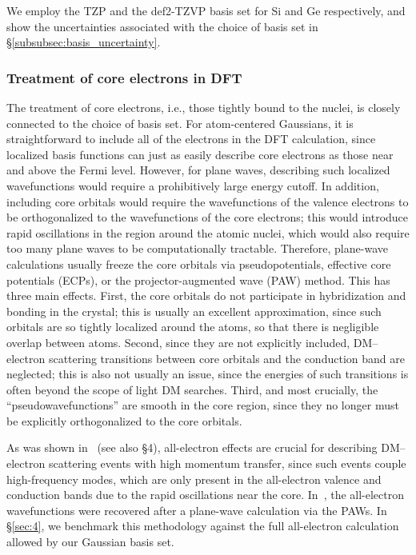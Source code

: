\documentclass[
    prd, twocolumn, superscriptaddress, nofootinbib, amsmath, amssymb,
    aps, floatfix,preprintnumbers
]{revtex4-2}
\begin{document}
        We employ the TZP and the def2-TZVP basis set for Si and Ge respectively, and show the uncertainties associated with the choice of basis set in \S\ref{subsubsec:basis_uncertainty}.
        
        \subsubsection{Treatment of core electrons in DFT}\label{subsubsec:2.1.2}
        The treatment of core electrons, i.e., those tightly bound to the nuclei, is closely connected to the choice of basis set. For atom-centered Gaussians, it is straightforward to include all of the electrons in the DFT calculation, since localized basis functions can just as easily describe core electrons as those near and above the Fermi level. 
        However, for plane waves, describing such localized wavefunctions would require a prohibitively large energy cutoff. In addition, including core orbitals would require the wavefunctions of the valence electrons to be orthogonalized to the wavefunctions of the core electrons; this  would introduce rapid oscillations in the region around the atomic nuclei, which would also require too many plane waves to be computationally tractable. Therefore, plane-wave calculations usually freeze the core orbitals via pseudopotentials, effective core potentials (ECPs), or the projector-augmented wave (PAW) method. This has three main effects. First, the core orbitals do not participate in hybridization and bonding in the crystal; this is usually an excellent approximation, since such orbitals are so tightly localized around the atoms, so that there is negligible overlap between atoms. Second, since they are not explicitly included, DM--electron scattering transitions between core orbitals and the conduction band are neglected; this is also not usually an issue, since the energies of such transitions is often beyond the scope of light DM searches. Third, and most crucially, the ``pseudowavefunctions'' are smooth in the core region, since they no longer must be explicitly orthogonalized to the core orbitals. 
        
        As was shown in~\cite{Liang:2018bdb,Griffin21} (see also \S 4), all-electron effects are crucial for describing DM--electron scattering events with high momentum transfer, since such events couple high-frequency modes, which are only present in the all-electron valence and conduction bands due to the rapid oscillations near the core. In~\cite{Griffin21}, the all-electron wavefunctions were recovered after a plane-wave calculation via the PAWs. In \S\ref{sec:4}, we benchmark this methodology against the full all-electron calculation allowed by our Gaussian basis set. 
            
\end{document}
